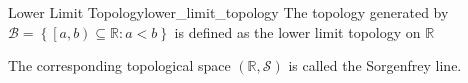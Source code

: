 \begin{definition}
{Lower Limit Topology}{lower_limit_topology}
     The topology generated by \(\mathcal{B} = \left\{\left[ a, b
\right) \subseteq \mathbb{R}: a < b \right\} \) is defined as the lower
     limit topology on \(\mathbb{R} \)
\end{definition}
The corresponding topological space \(\left(\mathbb{R}, \mathcal{S}\right)
\) is called the Sorgenfrey line.
